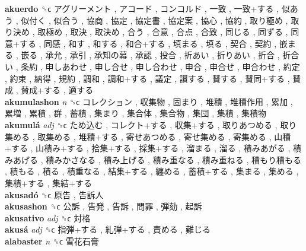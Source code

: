 \textbf{akuerdo} ␝ϲ   アグリーメント ,  アコード ,  コンコルド ,  一致 ,  一致+する ,  似あう ,  似付く ,  似合う ,  協商 ,  協定 ,  協定書 ,  協定案 ,  協心 ,  協約 ,  取り極め ,  取り決め ,  取極め ,  取決 ,  取決め ,  合う ,  合意 ,  合点 ,  合致 ,  同じる ,  同ずる ,  同意+する ,  同感 ,  和す ,  和する ,  和合+する ,  填まる ,  填る ,  契合 ,  契約 ,  嵌まる ,  嵌る ,  承允 ,  承引 ,  承知の幕 ,  承認 ,  投合 ,  折あい ,  折りあい ,  折合 ,  折合い ,  条約 ,  申しあわせ ,  申し合せ ,  申し合わせ ,  申合 ,  申合せ ,  申合わせ ,  約定 ,  約束 ,  納得 ,  規約 ,  調和 ,  調和+する ,  議定 ,  讃する ,  賛する ,  賛同+する ,  賛成 ,  賛成+する ,  適する   \\
\textbf{akumulashon} \emph{n}  ␝ϲ   コレクション ,  収集物 ,  固まり ,  堆積 ,  堆積作用 ,  累加 ,  累増 ,  累積 ,  群 ,  蓄積 ,  集まり ,  集合体 ,  集合物 ,  集団 ,  集積 ,  集積物   \\
\textbf{akumulá} \emph{adj}  ␝ϲ   ため込む ,  コレクト+する ,  収集+する ,  取りあつめる ,  取り集める ,  取集める ,  堆積+する ,  寄せあつめる ,  寄せ集める ,  寄集める ,  山積+する ,  山積み+する ,  拾集+する ,  採集+する ,  溜まる ,  溜る ,  積みあがる ,  積みあげる ,  積みかさなる ,  積み上げる ,  積み重なる ,  積み重ねる ,  積もり積もる ,  積もる ,  積る ,  積重なる ,  結集+する ,  纏める ,  蓄積+する ,  集まる ,  集める ,  集積+する ,  集結+する   \\
\textbf{akusadó} ␝ϲ   原告 ,  告訴人   \\
\textbf{akusashon} ␝ϲ   公訴 ,  告発 ,  告訴 ,  問罪 ,  弾劾 ,  起訴   \\
\textbf{akusativo} \emph{adj}  ␝ϲ   対格   \\
\textbf{akusá} \emph{adj}  ␝ϲ   指弾+する ,  糺弾+する ,  責める ,  難じる   \\
\textbf{alabaster} \emph{n}  ␝ϲ   雪花石膏   \\
